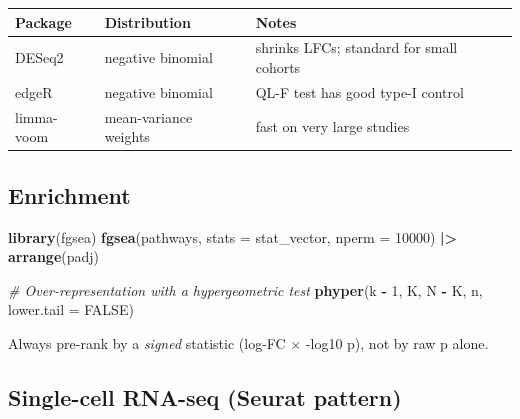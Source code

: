 \documentclass[
]{article}
\newenvironment{Shaded}{\begin{snugshade}}{\end{snugshade}}
\newcommand{\AttributeTok}[1]{\textcolor[rgb]{0.13,0.29,0.53}{#1}}
\newcommand{\CommentTok}[1]{\textcolor[rgb]{0.56,0.35,0.01}{\textit{#1}}}
\newcommand{\ConstantTok}[1]{\textcolor[rgb]{0.56,0.35,0.01}{#1}}
\newcommand{\DecValTok}[1]{\textcolor[rgb]{0.00,0.00,0.81}{#1}}
\newcommand{\FunctionTok}[1]{\textcolor[rgb]{0.13,0.29,0.53}{\textbf{#1}}}
\newcommand{\NormalTok}[1]{#1}
\newcommand{\SpecialCharTok}[1]{\textcolor[rgb]{0.81,0.36,0.00}{\textbf{#1}}}
\newcounter{none} %
\begin{document}
{\def\LTcaptype{none} %
\begin{longtable}[]{@{}
  >{\raggedright\arraybackslash}p{}
  >{\raggedright\arraybackslash}p{}
  >{\raggedright\arraybackslash}p{}@{}}
\toprule\noalign{}
\begin{minipage}[b]{\linewidth}\raggedright
Package
\end{minipage} & \begin{minipage}[b]{\linewidth}\raggedright
Distribution
\end{minipage} & \begin{minipage}[b]{\linewidth}\raggedright
Notes
\end{minipage} \\
\midrule\noalign{}
\endhead
\bottomrule\noalign{}
\endlastfoot
DESeq2 & negative binomial & shrinks LFCs; standard for small cohorts \\
edgeR & negative binomial & QL-F test has good type-I control \\
limma-voom & mean-variance weights & fast on very large studies \\
\end{longtable}
}

\subsection{Enrichment}\label{enrichment}

\begin{Shaded}
\begin{Highlighting}[]
\FunctionTok{library}\NormalTok{(fgsea)}
\FunctionTok{fgsea}\NormalTok{(pathways, }\AttributeTok{stats =}\NormalTok{ stat\_vector, }\AttributeTok{nperm =} \DecValTok{10000}\NormalTok{) }\SpecialCharTok{|\textgreater{}}
  \FunctionTok{arrange}\NormalTok{(padj)}

\CommentTok{\# Over{-}representation with a hypergeometric test}
\FunctionTok{phyper}\NormalTok{(k }\SpecialCharTok{{-}} \DecValTok{1}\NormalTok{, K, N }\SpecialCharTok{{-}}\NormalTok{ K, n, }\AttributeTok{lower.tail =} \ConstantTok{FALSE}\NormalTok{)}
\end{Highlighting}
\end{Shaded}

Always pre-rank by a \emph{signed} statistic (log-FC × -log10 p), not by
raw p alone.

\subsection{Single-cell RNA-seq (Seurat
pattern)}\label{single-cell-rna-seq-seurat-pattern}
\end{document}
